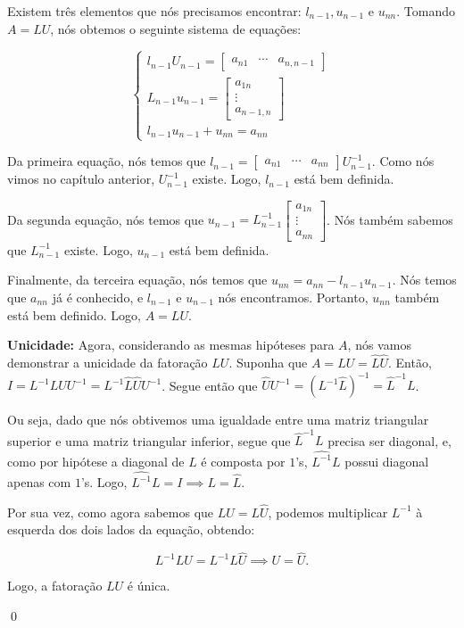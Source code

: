 \begin{Proof}
	Existem três elementos que nós precisamos encontrar: $l_{n - 1}, u_{n - 1}$ e $u_{nn}$. Tomando $A = LU$, nós obtemos o seguinte sistema de equações:
	
	$$
	\begin{cases}
		l_{n - 1}U_{n - 1} = \begin{bmatrix}
			a_{n1} & \cdots & a_{n, n - 1}
		\end{bmatrix} \\
		L_{n - 1}u_{n - 1} = \begin{bmatrix}
			a_{1n} \\ \vdots \\ a_{n - 1, n}
		\end{bmatrix} \\
		l_{n - 1}u_{n - 1} + u_{nn} = a_{nn}
	\end{cases}
	$$
	
	Da primeira equação, nós temos que $l_{n - 1} = \begin{bmatrix}
		a_{n1} & \cdots & a_{nn}
	\end{bmatrix}U_{n - 1}^{-1}$. Como nós vimos no capítulo anterior, $U_{n - 1}^{-1}$ existe. Logo, $l_{n - 1}$ está bem definida.
	
	Da segunda equação, nós temos que $u_{n - 1} = L_{n - 1}^{-1}\begin{bmatrix}
		a_{1n} \\
		\vdots \\
		a_{nn}
	\end{bmatrix}$. Nós também sabemos que $L_{n - 1}^{-1}$ existe. Logo, $u_{n - 1}$ está bem definida.
	
	Finalmente, da terceira equação, nós temos que $u_{nn} = a_{nn} - l_{n - 1}u_{n - 1}$. Nós temos que $a_{nn}$ já é conhecido, e $l_{n - 1}$ e $u_{n - 1}$ nós encontramos. Portanto, $u_{nn}$ também está bem definido. Logo, $A = LU$.
	
	\textbf{Unicidade:} Agora, considerando as mesmas hipóteses para $A$, nós vamos demonstrar a unicidade da fatoração $LU$. Suponha que $A = LU = \hat{L}\hat{U}$. Então, $I = L^{-1}LUU^{-1} = L^{-1}\hat{L}\hat{U}U^{-1}$. Segue então que $\hat{U}U^{-1} = (L^{-1}\hat{L})^{-1} = \hat{L}^{-1}L$. 
	
	Ou seja, dado que nós obtivemos uma igualdade entre uma matriz triangular superior e uma matriz triangular inferior, segue que $\hat{L}^{-1}L$ precisa ser diagonal, e, como por hipótese a diagonal de $L$ é composta por $1$'s, $\hat{L^{-1}}L$ possui diagonal apenas com $1$'s. Logo, $\hat{L^{-1}}L = I \implies L = \hat{L}$.
	
	Por sua vez, como agora sabemos que $LU = L\hat{U}$, podemos multiplicar $L^{-1}$ à esquerda dos dois lados da equação, obtendo:
	
	$$
	L^{-1}LU = L^{-1}L\hat{U} \implies U = \hat{U}.
	$$
	
	Logo, a fatoração $LU$ é única.
	
	\qed
\end{Proof}

